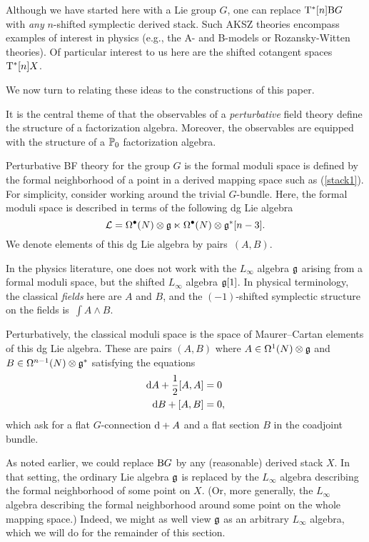\documentclass[11pt]{amsart}
\numberwithin{equation}{section}
\begin{document}
Although we have started here with a Lie group $G$, 
one can replace ${\rm T}^*[n] {\rm B}G$ with {\em any} $n$-shifted symplectic derived stack.
Such AKSZ theories encompass examples of interest in physics (e.g., the A- and B-models or Rozansky-Witten theories).
Of particular interest to us here are the shifted cotangent spaces~${\rm T}^*[n] X$.

We now turn to relating these ideas to the constructions of this paper.

It is the central theme of \cite{CG1, CG2} that the observables of a {\em perturbative} field theory define the structure of a factorization algebra. 
Moreover, the observables are equipped with the structure of a $\mathbb P_0$ factorization algebra.

Perturbative BF theory for the group $G$ is the formal moduli space is defined by the formal neighborhood of a point in a derived mapping space such as (\ref{stack1}). 
For simplicity, consider working around the trivial $G$-bundle. 
Here, the formal moduli space is described in terms of the following dg Lie algebra 
\begin{equation}\label{eqn:fields}
\mathcal L = \Omega^{\bullet} (N) \otimes \mathfrak g \ltimes \Omega^{\bullet} (N) \otimes \mathfrak g^* [n-3] .
\end{equation}
We denote elements of this dg Lie algebra by pairs~$(A,B)$. 

\begin{rmk}
In the physics literature, one does not work with the $L_\infty$ algebra $\mathfrak g$ arising from a formal moduli space,
but the shifted $L_\infty$ algebra $\mathfrak g[1]$. 
In physical terminology, the classical {\em fields} here are $A$ and $B$, 
and the $(-1)$-shifted symplectic structure on the fields is~$\int A \wedge B$. 
\end{rmk}

Perturbatively, the classical moduli space is the space of Maurer--Cartan elements of this dg Lie algebra.
These are pairs $(A,B)$ where $A \in \Omega^1 (N) \otimes \mathfrak g$ and $B \in \Omega^{n-1} (N) \otimes \mathfrak g^*$ satisfying the equations
\begin{align*}
{\rm d} A + \frac12 [A,A] & = 0 \\
{\rm d} B + [A,B] & = 0 ,
\end{align*}
which ask for a flat $G$-connection ${\rm d} + A$ and a flat section $B$ in the coadjoint bundle.

As noted earlier, we could replace ${\rm B}G$ by any (reasonable) derived stack $X$.
In that setting, the ordinary Lie algebra $\mathfrak g$ is replaced by the $L_\infty$ algebra describing the formal neighborhood of some point on $X$.
(Or, more generally, the $L_\infty$ algebra describing the formal neighborhood around some point on the whole mapping space.)
Indeed, we might as well view $\mathfrak g$ as an arbitrary $L_\infty$ algebra,
which we will do for the remainder of this section. 
\end{document}
